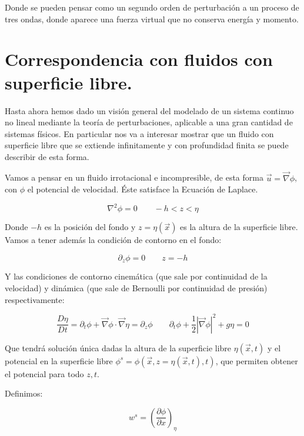 Donde se pueden pensar como un segundo orden de perturbación a un proceso de tres ondas, donde aparece una fuerza virtual que no conserva energía y momento. 



\section{Correspondencia con fluidos con superficie libre.}
Hasta ahora hemos dado un visión general del modelado de un sistema continuo no lineal mediante la teoría de perturbaciones, aplicable a una gran cantidad de sistemas físicos. En particular nos va a interesar mostrar que un fluido con superficie libre que se extiende infinitamente y con profundidad finita se puede describir de esta forma.

Vamos a pensar en un fluido irrotacional e incompresible, de esta forma $\vec u = \vec \nabla \phi$, con $\phi$ el potencial de velocidad. Éste satisface la Ecuación de Laplace.

\begin{equation}
	\nabla^2\phi = 0 \qquad -h<z<\eta
\end{equation}

Donde $-h$ es la posición del fondo y $z=\eta(\vec x)$ es la altura de la superficie libre. Vamos a tener además la condición de contorno en el fondo:

\begin{equation}
	\partial_z\phi=0 \qquad z=-h
\end{equation}

Y las condiciones de contorno cinemática (que sale por continuidad de la velocidad) y dinámica (que sale de Bernoulli por continuidad de presión) respectivamente:

\begin{equation}
	\frac{D\eta}{Dt} = \partial_t \phi + \vec \nabla \phi \cdot \vec \nabla \eta = \partial_z \phi	 \qquad  \partial_t \phi + \frac{1}{2} |\vec \nabla \phi|^2 + g\eta = 0
\end{equation}

Que tendrá solución única dadas la altura de la superficie libre $\eta(\vec x,t)$ y el potencial en la superficie libre $\phi^s=\phi(\vec x, z=\eta(\vec x, t), t)$, que permiten obtener el potencial para todo $z, t$. \cite{meiTheoryApplicationsOcean2016}

Definimos:

\begin{equation}
	w^s = \left(\frac{\partial\phi}{\partial x}\right)_\eta
\end{equation} 

